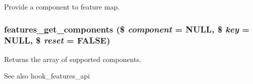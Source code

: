 \label{features_8module_a0b9ee0b432af2d3709e1f413923c3ae2}
Provide a component to feature map. \hypertarget{features_8module_a4b2d2e6aaa5c36d781cdda657285ee12}{
\subsubsection[{features\_\-get\_\-components}]{\setlength{\rightskip}{0pt plus 5cm}features\_\-get\_\-components (\$ {\em component} = {\ttfamily NULL}, \/  \$ {\em key} = {\ttfamily NULL}, \/  \$ {\em reset} = {\ttfamily FALSE})}}
\label{features_8module_a4b2d2e6aaa5c36d781cdda657285ee12}
Returns the array of supported components.

\begin{DoxySeeAlso}{See also}
hook\_\-features\_\-api
\end{DoxySeeAlso}


